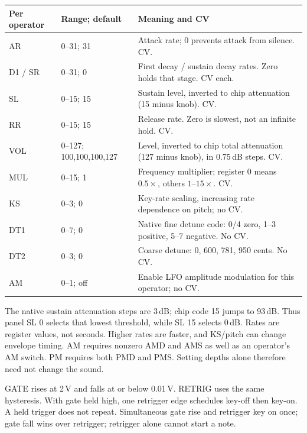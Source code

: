 \clearpage
\begin{longtable}{@{}p{}p{}p{}@{}}
\toprule Per operator & Range; default & Meaning and CV \\\midrule\endhead
AR & 0--31; 31 & Attack rate; 0 prevents attack from silence. CV. \\
D1 / SR & 0--31; 0 & First decay / sustain decay rates. Zero holds that stage. CV each. \\
SL & 0--15; 15 & Sustain level, inverted to chip attenuation (15 minus knob). CV. \\
RR & 0--15; 15 & Release rate. Zero is slowest, not an infinite hold. CV. \\
VOL & 0--127; 100,100,100,127 & Level, inverted to chip total attenuation (127 minus knob), in 0.75\,dB steps. CV. \\
MUL & 0--15; 1 & Frequency multiplier; register 0 means $0.5\times$, others $1$--$15\times$. CV. \\
KS & 0--3; 0 & Key-rate scaling, increasing rate dependence on pitch; no CV. \\
DT1 & 0--7; 0 & Native fine detune code: 0/4 zero, 1--3 positive, 5--7 negative. No CV. \\
DT2 & 0--3; 0 & Coarse detune: 0, 600, 781, 950 cents. No CV. \\
AM & 0--1; off & Enable LFO amplitude modulation for this operator; no CV. \\
\bottomrule
\end{longtable}

The native sustain attenuation steps are 3\,dB; chip code 15 jumps to 93\,dB.
Thus panel SL 0 selects that lowest threshold, while SL 15 selects 0\,dB.
Rates are register values, not seconds. Higher rates are faster, and KS/pitch
can change envelope timing. AM requires nonzero AMD and AMS as well as an
operator's AM switch. PM requires both PMD and PMS. Setting depths alone
therefore need not change the sound.

GATE rises at 2\,V and falls at or below 0.01\,V. RETRIG uses the same
hysteresis. With gate held high, one retrigger edge schedules key-off then
key-on. A held trigger does not repeat. Simultaneous gate rise and retrigger
key on once; gate fall wins over retrigger; retrigger alone cannot start a note.
